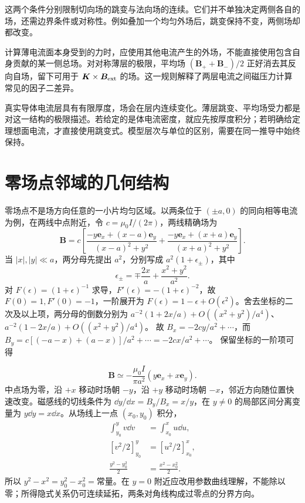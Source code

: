 这两个条件分别限制切向场的跳变与法向场的连续。它们并不单独决定两侧各自的场，还需边界条件或对称性。例如叠加一个均匀外场后，跳变保持不变，两侧场却都改变。


计算薄电流面本身受到的力时，应使用其他电流产生的外场，不能直接使用包含自身贡献的某一侧总场。对对称薄层的极限，平均场 $(\bm B_++\bm B_-)/2$ 正好消去其反向自场，留下可用于 $\bm K\times\bm B_{\rm ext}$ 的场。这一规则解释了两层电流之间磁压力计算常见的因子二差异。


真实导体电流层具有有限厚度，场会在层内连续变化。薄层跳变、平均场受力都是对这一结构的极限描述。若给定的是体电流密度，就应先按厚度积分；若明确给定理想面电流，才直接使用跳变式。模型层次与单位的区别，需要在同一推导中始终保持。




\section{零场点邻域的几何结构}
零场点不是场方向任意的一小片均匀区域。以两条位于 $(\pm a,0)$ 的同向相等电流为例，在两线中点附近，令 $c=\mu_0I/(2\pi)$，两线精确场为
\[
 \bm B=c\left[
 \frac{-y\bm e_x+(x-a)\bm e_y}{(x-a)^2+y^2}
 +\frac{-y\bm e_x+(x+a)\bm e_y}{(x+a)^2+y^2}\right].
\]
当 $|x|,|y|\ll a$，两分母先提出 $a^2$，分别写成 $a^2(1+\epsilon_\pm)$，其中
\[
 \epsilon_\pm=\mp\frac{2x}{a}+\frac{x^2+y^2}{a^2}.
\]
对 $F(\epsilon)=(1+\epsilon)^{-1}$ 求导，$F'(\epsilon)=-(1+\epsilon)^{-2}$，故 $F(0)=1,F'(0)=-1$，一阶展开为 $F(\epsilon)=1-\epsilon+O(\epsilon^2)$。舍去坐标的二次及以上项，两分母的倒数分别为 $a^{-2}(1+2x/a)+O((x^2+y^2)/a^4)$、
$a^{-2}(1-2x/a)+O((x^2+y^2)/a^4)$。
故 $B_x=-2cy/a^2+\cdots$，而
$B_y=c[(-a-x)+(a-x)]/a^2+\cdots=-2cx/a^2+\cdots$。
保留坐标的一阶项可得

\[
\bm B\simeq-\frac{\mu_0I}{\pi a^2}(y\bm e_x+x\bm e_y).
\]
中点场为零，沿 $+x$ 移动时场朝 $-y$，沿 $+y$ 移动时场朝 $-x$，邻近方向随位置快速改变。磁感线的切线条件为 $\dd y/\dd x=B_y/B_x=x/y$，在 $y\ne0$ 的局部区间分离变量为 $y\dd y=x\dd x$。从场线上一点 $(x_0,y_0)$ 积分，
\[
 \begin{aligned}
 \int_{y_0}^{y}v\dd v&=\int_{x_0}^{x}u\dd u,\\
 [v^2/2]_{y_0}^{y}&=[u^2/2]_{x_0}^{x},\\
 \frac{y^2-y_0^2}{2}&=\frac{x^2-x_0^2}{2}.
 \end{aligned}
\]
所以 $y^2-x^2=y_0^2-x_0^2=\text{常量}$。在 $y=0$ 附近应改用参数曲线理解，不能除以零；所得隐式关系仍可连续延拓，两条对角线构成过零点的分界方向。



